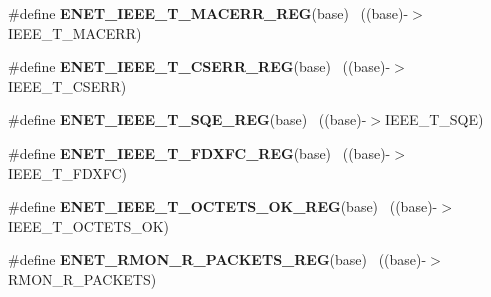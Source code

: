 \begin{DoxyCompactItemize}
\item 
\hypertarget{group___e_n_e_t___register___accessor___macros_ga8f2df9936d52185804abc7abbc0346f5}{}\#define {\bfseries E\+N\+E\+T\+\_\+\+I\+E\+E\+E\+\_\+\+T\+\_\+\+M\+A\+C\+E\+R\+R\+\_\+\+R\+E\+G}(base)                      ~((base)-\/$>$I\+E\+E\+E\+\_\+\+T\+\_\+\+M\+A\+C\+E\+R\+R)\label{group___e_n_e_t___register___accessor___macros_ga8f2df9936d52185804abc7abbc0346f5}

\item 
\hypertarget{group___e_n_e_t___register___accessor___macros_ga375f162af52cfafea573fdf22552142f}{}\#define {\bfseries E\+N\+E\+T\+\_\+\+I\+E\+E\+E\+\_\+\+T\+\_\+\+C\+S\+E\+R\+R\+\_\+\+R\+E\+G}(base)                        ~((base)-\/$>$I\+E\+E\+E\+\_\+\+T\+\_\+\+C\+S\+E\+R\+R)\label{group___e_n_e_t___register___accessor___macros_ga375f162af52cfafea573fdf22552142f}

\item 
\hypertarget{group___e_n_e_t___register___accessor___macros_gac62a9914ac458d5a2458ef05b9e116b3}{}\#define {\bfseries E\+N\+E\+T\+\_\+\+I\+E\+E\+E\+\_\+\+T\+\_\+\+S\+Q\+E\+\_\+\+R\+E\+G}(base)                            ~((base)-\/$>$I\+E\+E\+E\+\_\+\+T\+\_\+\+S\+Q\+E)\label{group___e_n_e_t___register___accessor___macros_gac62a9914ac458d5a2458ef05b9e116b3}

\item 
\hypertarget{group___e_n_e_t___register___accessor___macros_ga3c5d6636002b8e8c3a9d855e2fdcb7c1}{}\#define {\bfseries E\+N\+E\+T\+\_\+\+I\+E\+E\+E\+\_\+\+T\+\_\+\+F\+D\+X\+F\+C\+\_\+\+R\+E\+G}(base)                        ~((base)-\/$>$I\+E\+E\+E\+\_\+\+T\+\_\+\+F\+D\+X\+F\+C)\label{group___e_n_e_t___register___accessor___macros_ga3c5d6636002b8e8c3a9d855e2fdcb7c1}

\item 
\hypertarget{group___e_n_e_t___register___accessor___macros_ga5cfaddfa1d3f32647714e772d5b5eda5}{}\#define {\bfseries E\+N\+E\+T\+\_\+\+I\+E\+E\+E\+\_\+\+T\+\_\+\+O\+C\+T\+E\+T\+S\+\_\+\+O\+K\+\_\+\+R\+E\+G}(base)                ~((base)-\/$>$I\+E\+E\+E\+\_\+\+T\+\_\+\+O\+C\+T\+E\+T\+S\+\_\+\+O\+K)\label{group___e_n_e_t___register___accessor___macros_ga5cfaddfa1d3f32647714e772d5b5eda5}

\item 
\hypertarget{group___e_n_e_t___register___accessor___macros_ga5b3636bef9024f4cec4f6c3f18367f43}{}\#define {\bfseries E\+N\+E\+T\+\_\+\+R\+M\+O\+N\+\_\+\+R\+\_\+\+P\+A\+C\+K\+E\+T\+S\+\_\+\+R\+E\+G}(base)                    ~((base)-\/$>$R\+M\+O\+N\+\_\+\+R\+\_\+\+P\+A\+C\+K\+E\+T\+S)\label{group___e_n_e_t___register___accessor___macros_ga5b3636bef9024f4cec4f6c3f18367f43}


\end{DoxyCompactItemize}
